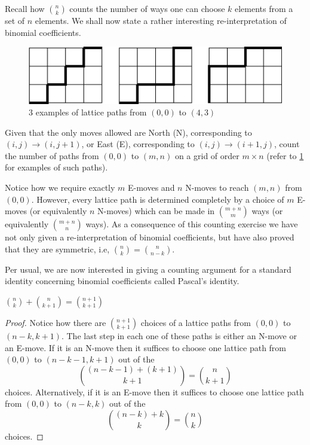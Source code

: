 Recall how $\binom{n}{k}$ counts the number of ways one can choose $k$ elements from a set of $n$ elements. We shall now state a rather interesting re-interpretation of binomial coefficients. 
\begin{figure}[H]
	\centering
	\includegraphics[scale=0.6]{Images/Figure8.png}
	\caption{$3$ examples of lattice paths from $\left( 0,0 \right)$ to $\left( 4,3 \right) $}
	\label{f:1.8}
\end{figure}
\begin{question}
	Given that the only moves allowed are North (N), corresponding to $\left( i,j \right) \to \left( i,j+1 \right)$, or East (E), corresponding to $\left( i,j \right)\to \left( i+1,j \right)$, count the number of paths from $\left( 0,0 \right)$ to $\left( m,n \right)$ on a grid of order $m\times n$ (refer to \cref{f:1.8} for examples of such paths).
\end{question}
Notice how we require exactly $m$ E-moves and $n$ N-moves to reach $\left( m,n \right)$ from $\left( 0,0 \right)$. However, every lattice path is determined completely by a choice of $m$ E-moves (or equivalently $n$ N-moves) which can be made in $\binom{m+n}{m}$ ways (or equivalently $\binom{m+n}{n}$ ways). As a consequence of this counting exercise we have not only given a re-interpretation of binomial coefficients, but have also proved that they are symmetric, i.e, $\binom{n}{k}=\binom{n}{n-k}$.

Per usual, we are now interested in giving a counting argument for a standard identity concerning binomial coefficients called Pascal's identity.
\begin{claim}
	\label{c:1.3}
	$\binom{n}{k} + \binom{n}{k+1} = \binom{n+1}{k+1}$
\end{claim}
\begin{proof}
	Notice how there are $\binom{n+1}{k+1}$ choices of a lattice paths from $\left( 0,0 \right)$ to $\left( n-k,k+1 \right)$. The last step in each one of these paths is either an N-move or an E-move. If it is an N-move then it suffices to choose one lattice path from $\left( 0,0 \right)$ to $\left( n-k-1,k+1 \right)$ out of the \[
		\binom{\left( n-k-1 \right) + \left( k+1 \right)}{k+1} = \binom{n}{k+1}
	\] choices. Alternatively, if it is an E-move then it suffices to choose one lattice path from $\left( 0,0 \right)$ to $\left( n-k,k \right)$ out of the \[
	\binom{\left( n-k \right) + k}{k} = \binom{n}{k}
	\] choices.
\end{proof}

